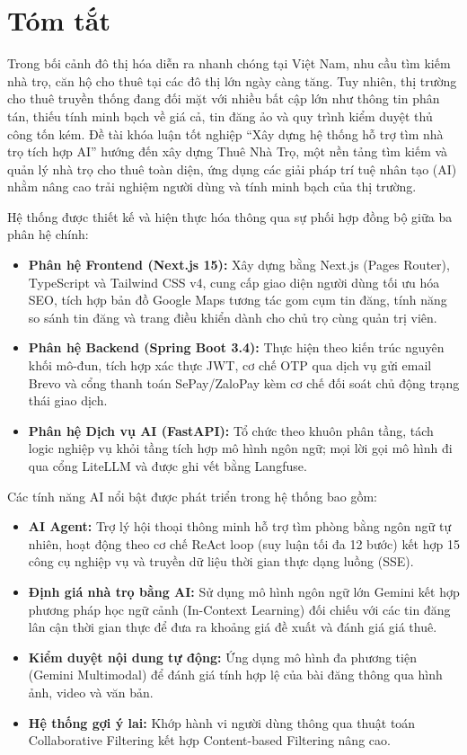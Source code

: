 \chapter*{Tóm tắt}
\label{summary}

Trong bối cảnh đô thị hóa diễn ra nhanh chóng tại Việt Nam, nhu cầu tìm kiếm nhà trọ, căn hộ cho thuê tại các đô thị lớn ngày càng tăng. Tuy nhiên, thị trường cho thuê truyền thống đang đối mặt với nhiều bất cập lớn như thông tin phân tán, thiếu tính minh bạch về giá cả, tin đăng ảo và quy trình kiểm duyệt thủ công tốn kém. Đề tài khóa luận tốt nghiệp ``Xây dựng hệ thống hỗ trợ tìm nhà trọ tích hợp AI'' hướng đến xây dựng Thuê Nhà Trọ, một nền tảng tìm kiếm và quản lý nhà trọ cho thuê toàn diện, ứng dụng các giải pháp trí tuệ nhân tạo (AI) nhằm nâng cao trải nghiệm người dùng và tính minh bạch của thị trường.

Hệ thống được thiết kế và hiện thực hóa thông qua sự phối hợp đồng bộ giữa ba phân hệ chính:
\begin{itemize}
    \item \textbf{Phân hệ Frontend (Next.js 15):} Xây dựng bằng Next.js (Pages Router), TypeScript và Tailwind CSS v4, cung cấp giao diện người dùng tối ưu hóa SEO, tích hợp bản đồ Google Maps tương tác gom cụm tin đăng, tính năng so sánh tin đăng và trang điều khiển dành cho chủ trọ cùng quản trị viên.
    \item \textbf{Phân hệ Backend (Spring Boot 3.4):} Thực hiện theo kiến trúc nguyên khối mô-đun, tích hợp xác thực JWT, cơ chế OTP qua dịch vụ gửi email Brevo và cổng thanh toán SePay/ZaloPay kèm cơ chế đối soát chủ động trạng thái giao dịch.
    \item \textbf{Phân hệ Dịch vụ AI (FastAPI):} Tổ chức theo khuôn phân tầng, tách logic nghiệp vụ khỏi tầng tích hợp mô hình ngôn ngữ; mọi lời gọi mô hình đi qua cổng LiteLLM và được ghi vết bằng Langfuse.
\end{itemize}

Các tính năng AI nổi bật được phát triển trong hệ thống bao gồm:
\begin{itemize}
    \item \textbf{AI Agent:} Trợ lý hội thoại thông minh hỗ trợ tìm phòng bằng ngôn ngữ tự nhiên, hoạt động theo cơ chế ReAct loop (suy luận tối đa 12 bước) kết hợp 15 công cụ nghiệp vụ và truyền dữ liệu thời gian thực dạng luồng (SSE).
    \item \textbf{Định giá nhà trọ bằng AI:} Sử dụng mô hình ngôn ngữ lớn Gemini kết hợp phương pháp học ngữ cảnh (In-Context Learning) đối chiếu với các tin đăng lân cận thời gian thực để đưa ra khoảng giá đề xuất và đánh giá giá thuê.
    \item \textbf{Kiểm duyệt nội dung tự động:} Ứng dụng mô hình đa phương tiện (Gemini Multimodal) để đánh giá tính hợp lệ của bài đăng thông qua hình ảnh, video và văn bản.
    \item \textbf{Hệ thống gợi ý lai:} Khớp hành vi người dùng thông qua thuật toán Collaborative Filtering kết hợp Content-based Filtering nâng cao.
\end{itemize}


